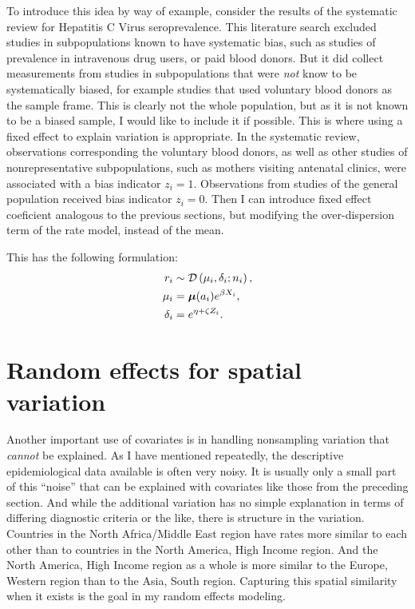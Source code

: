 To introduce this idea by way of example, consider the results of the
systematic review for Hepatitis C Virus seroprevalence.  This
literature search excluded studies in subpopulations known to have
systematic bias, such as studies of prevalence in intravenous drug
users, or paid blood donors.  But it did collect measurements from
studies in subpopulations that were \emph{not} know to be
systematically biased, for example studies that used voluntary blood
donors as the sample frame.  This is clearly not the whole population,
but as it is not known to be a biased sample, I would like to include
it if possible.  This is where using a fixed effect to explain
variation is appropriate. In the systematic review, observations corresponding
the voluntary blood donors, as well as other studies of nonrepresentative
subpopulations, such as mothers visiting antenatal clinics, were
associated with a
bias indicator $z_i = 1$.  Observations from studies of the general
population received bias indicator $z_i = 0$.  Then I can 
introduce fixed effect coeficient analogous to the previous sections,
but modifying the over-dispersion term of the rate model, instead of
the mean.

This has the following
formulation:
\begin{align*}
r_i &\sim \mathcal{D}\left(\mu_i, \delta_i; n_i\right),\\
\mu_i &= \boldsymbol{\mu}(a_i)e^{\beta X_i},\\
\delta_i &= e^{\eta + \zeta Z_i}.
\end{align*}

\section{Random effects for spatial variation}
Another important use of covariates is in handling nonsampling
variation that \emph{cannot} be explained. As I have mentioned
repeatedly, the descriptive epidemiological data available is often
very noisy.  It is usually only a small part of this ``noise'' that
can be explained with covariates like those from the preceding
section. And while the additional variation has no simple explanation
in terms of differing diagnostic criteria or the like, there is
structure in the variation. Countries in the North Africa/Middle East
region have rates more similar to each other than to countries in the
North America, High Income region.  And the North America, High Income
region as a whole is more similar to the Europe, Western region than
to the Asia, South region.  Capturing this spatial similarity when it
exists is the goal in my random effects modeling.

